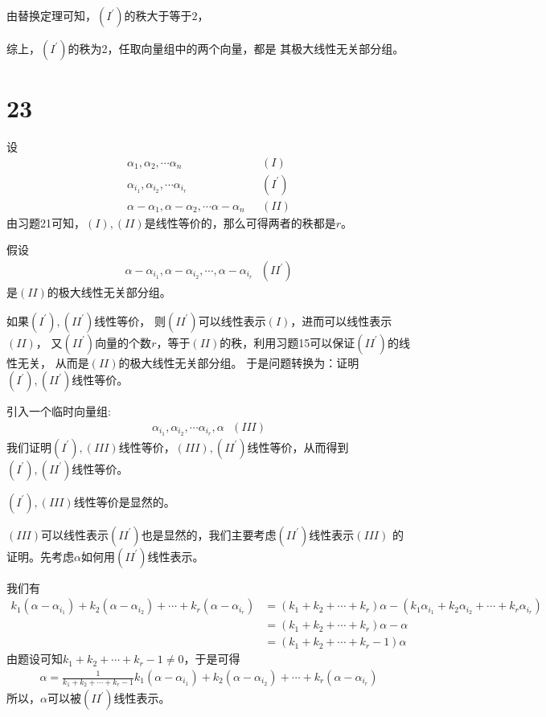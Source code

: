 \documentclass{article}
\begin{document}
由替换定理可知，$(I^\prime)$的秩大于等于$2$，

综上，$(I^\prime)$的秩为2，任取向量组中的两个向量，都是
其极大线性无关部分组。

\section*{23}

设
\begin{align*}
  \alpha_1, \alpha_2, \cdots \alpha_n                            & \ \ \ (I)        \\
  \alpha_{i_1}, \alpha_{i_2}, \cdots \alpha_{i_r}                & \ \ \ (I^\prime) \\
  \alpha - \alpha_1, \alpha - \alpha_2, \cdots \alpha - \alpha_n & \ \ \ (II)
\end{align*}
由习题21可知，$(I),(II)$是线性等价的，那么可得两者的秩都是$r$。

假设
\begin{align*}
  \alpha - \alpha_{i_1}, \alpha - \alpha_{i_2}, \cdots, \alpha - \alpha_{i_r} \ \ \ (II^\prime)
\end{align*}
是$(II)$的极大线性无关部分组。

如果$(I^\prime), (II^\prime)$线性等价，
则$(II^\prime)$可以线性表示$(I)$，进而可以线性表示$(II)$，
又$(II^\prime)$向量的个数$r$，等于$(II)$的秩，利用习题15可以保证$(II^\prime)$的线性无关，
从而是$(II)$的极大线性无关部分组。
于是问题转换为：证明$(I^\prime), (II^\prime)$线性等价。


引入一个临时向量组:
\begin{align*}
  \alpha_{i_1}, \alpha_{i_2}, \cdots \alpha_{i_r}, \alpha \ \ \ (III)
\end{align*}
我们证明$(I^\prime), (III)$线性等价，$(III), (II^\prime)$线性等价，从而得到
$(I^\prime), (II^\prime)$线性等价。

$(I^\prime), (III)$线性等价是显然的。

$(III)$可以线性表示$(II^\prime)$也是显然的，我们主要考虑$(II^\prime)$线性表示$(III)$
的证明。先考虑$\alpha$如何用$(II^\prime)$线性表示。

我们有
\begin{align*}
  k_1 (\alpha - \alpha_{i_1}) + k_2 (\alpha - \alpha_{i_2}) + \cdots + k_r (\alpha - \alpha_{i_r})
   & = (k_1 + k_2 + \cdots + k_r)\alpha - (k_1\alpha_{i_1} + k_2\alpha_{i_2} + \cdots + k_r\alpha_{i_r}) \\
   & = (k_1 + k_2 + \cdots + k_r)\alpha - \alpha                                                         \\
   & = (k_1 + k_2 + \cdots + k_r - 1)\alpha
\end{align*}
由题设可知$k_1 + k_2 + \cdots + k_r - 1 \neq 0$，于是可得
\begin{align*}
  \alpha = \frac{1}{k_1 + k_2 + \cdots + k_r - 1} k_1 (\alpha - \alpha_{i_1}) + k_2 (\alpha - \alpha_{i_2}) + \cdots + k_r (\alpha - \alpha_{i_r})
\end{align*}
所以，$\alpha$可以被$(II^\prime)$线性表示。
\end{document}
